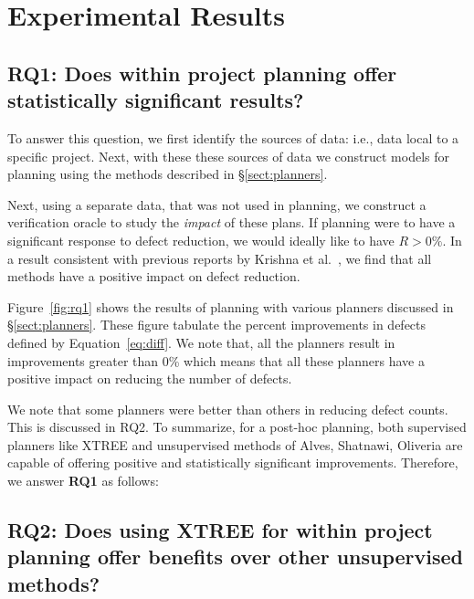 \documentclass[10pt,journal,compsoc]{IEEEtran}
\newcommand{\tion}[1]{\S\ref{sect:#1}}
\newcommand{\fig}[1]{Figure~\ref{fig:#1}}
\newcommand{\eq}[1]{Equation~\ref{eq:#1}}
\begin{document}
\section{Experimental Results}
\label{sect:results}

\subsection*{{\bf RQ1: Does within project planning offer statistically significant results?}}

To answer this question, we first identify the sources of data: i.e., data local to a specific project. Next, with these these sources of data we construct models for planning using the methods described in \tion{planners}. 

Next, using a separate data, that was not used in planning, we construct a verification oracle to study the \textit{impact} of these plans.  If planning were to have a significant response to defect reduction, we would ideally like to have $R>0\%$. In a result consistent with previous reports by Krishna et al.~\cite{krishna17a}, we find that all methods have a positive impact on defect reduction.

\fig{rq1} shows the results of planning with various planners discussed in \tion{planners}. These figure tabulate the percent improvements in defects defined by \eq{diff}. We note that, all the planners result in improvements greater than 0\% which means that all these planners have a positive impact on reducing the number of defects.

We note that some planners were better than others in reducing defect counts. This is discussed in RQ2. To summarize, for a post-hoc planning, both supervised planners like XTREE and unsupervised methods of Alves, Shatnawi, Oliveria are capable of offering positive and statistically significant improvements. Therefore, we answer \textbf{RQ1} as follows:


\subsection*{{\bf RQ2: Does using XTREE for within project planning offer benefits over other unsupervised methods?}}
\end{document}
